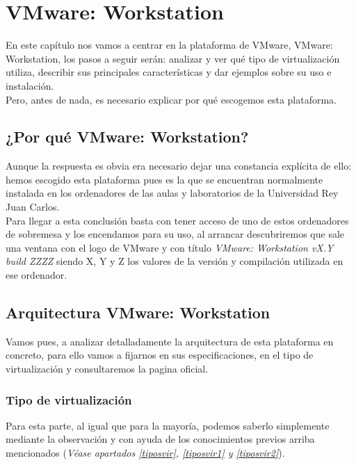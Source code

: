 \chapter{VMware: Workstation}
\lettrine[lines=1,slope=4pt,findent=0pt]{E}{}n este capítulo nos vamos a centrar en la plataforma de VMware, VMware: Workstation\cite{vmwarework}, los pasos a seguir serán: analizar y ver qué tipo de virtualización utiliza, describir sus principales características y dar ejemplos sobre su uso e instalación.\\

Pero, antes de nada, es necesario explicar por qué escogemos esta plataforma.

\section{¿Por qué VMware: Workstation?}
Aunque la respuesta es obvia era necesario dejar una constancia explícita de ello: hemos escogido esta plataforma pues es la que se encuentran normalmente instalada en los ordenadores de las aulas y laboratorios de la Universidad Rey Juan Carlos.\\

Para llegar a esta conclusión basta con tener acceso de uno de estos ordenadores de sobremesa y los encendamos para su uso, al arrancar descubriremos que sale una ventana con el logo de VMware y con título \emph{VMware: Workstation vX.Y build ZZZZ} siendo X, Y y Z los valores de la versión y compilación utilizada en ese ordenador.

\section{Arquitectura VMware: Workstation}
Vamos pues, a analizar detalladamente la arquitectura de esta plataforma en concreto, para ello vamos a fijarnos en sus especificaciones, en el tipo de virtualización y consultaremos la pagina oficial\cite{vmwarework}\cite{vmwareworkhelp}.

\subsection{Tipo de virtualización}
Para esta parte, al igual que para la mayoría, podemos saberlo simplemente mediante la observación y con ayuda de los conocimientos previos arriba mencionados (\textit{Véase apartados \ref{tiposvir}, \ref{tiposvir1} y \ref{tiposvir2}}).\\

